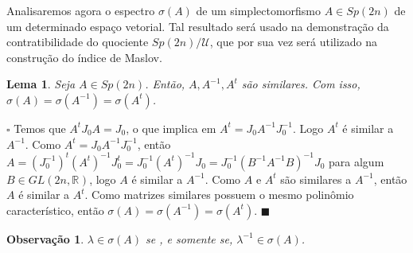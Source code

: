 \documentclass[12pt]{book}
\newtheorem{lema}[teorema]{Lema}
\newtheorem{observacao}[teorema]{Observação}
\newenvironment{prova}[1]{$\square$ #1}{\hfill$\blacksquare$}
\newcommand{\espectrooperador}[1]{\sigma(#1)}
\newcommand{\estruturacomplexa}{J_{0}}
\newcommand{\generalgroup}[2]{GL(#1, #2)}
\newcommand{\generalgroupreal}[1]{\generalgroup{#1}{\real{}}}
\newcommand{\gruposimpletico}[1]{Sp(#1)}
\newcommand{\matrizSimpleticaOrtogonal}{\mathcal{U}}
\newcommand{\real}[1]{\mathbb{R}^{#1}}
\begin{document}
	Analisaremos agora o espectro $\espectrooperador{A}$ de um simplectomorfismo $A \in \gruposimpletico{2n}$ de um determinado espaço vetorial. Tal resultado será usado na demonstração da contratibilidade do quociente $\gruposimpletico{2n}/\matrizSimpleticaOrtogonal$, que por sua vez será utilizado na construção do índice de Maslov.
	
	\begin{lema}
		Seja $A \in \gruposimpletico{2n}$. Então, $A, A^{-1}, A^{t}$ são similares. Com isso, $\sigma(A) = \sigma(A^{-1}) = \sigma(A^{t}) $.
	\end{lema}
	\begin{prova}
		Temos que $A^{t}\estruturacomplexa A = \estruturacomplexa$, o que implica em $A^{t} = \estruturacomplexa A^{-1} \estruturacomplexa^{-1}$. Logo $A^{t}$ é similar a $A^{-1}$. Como $A^{t} = \estruturacomplexa A^{-1} \estruturacomplexa^{-1}$, então $A = (\estruturacomplexa^{-1})^{t} (A^{t})^{-1} \estruturacomplexa^{t} = \estruturacomplexa^{-1}(A^{t})^{-1}\estruturacomplexa = \estruturacomplexa^{-1}(B^{-1}A^{-1}B)^{-1}\estruturacomplexa$ para algum $B \in \generalgroupreal{2n}$, logo $A$ é similar a $A^{-1}$. Como $A$ e $A^{t}$ são similares a $A^{-1}$, então $A$ é similar a $A^{t}$. Como matrizes similares possuem o mesmo polinômio característico, então $\sigma(A) = \sigma(A^{-1}) = \sigma(A^{t}) $.
	\end{prova}
	
	\begin{observacao}
		$\lambda \in \sigma(A)$ se , e somente se, $\lambda^{-1}\in \sigma(A)$.
	\end{observacao}
	
\end{document}
